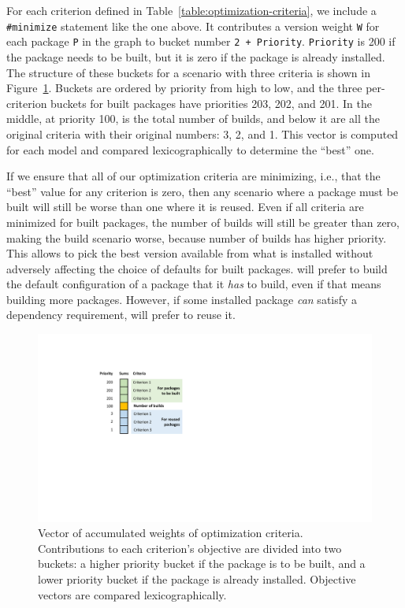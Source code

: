 For each criterion defined in Table~\ref{table:optimization-criteria}, we include a {\tt
  \#minimize} statement like the one above. It contributes a version weight {\tt W} for
each package {\tt P} in the graph to bucket number {\tt 2 + Priority}. {\tt Priority} is
200 if the package needs to be built, but it is zero if the package is already
installed. The structure of these buckets for a scenario with three criteria is shown in
Figure~\ref{fig:opt-vector}. Buckets are ordered by priority from high to low, and the
three per-criterion buckets for built packages have priorities 203, 202, and 201. In the
middle, at priority 100, is the total number of builds, and below it are all the
original criteria with their original numbers: 3, 2, and 1. This vector is computed for
each model and compared lexicographically to determine the ``best'' one.

If we ensure that all of our optimization criteria are minimizing, i.e., that the
``best'' value for any criterion is zero, then any scenario where a package must be
built will still be worse than one where it is reused. Even if all criteria are
minimized for built packages, the number of builds will still be greater than zero,
making the build scenario worse, because number of builds has higher priority. This
allows \spack{} to pick the best version available from what is installed without
adversely affecting the choice of defaults for built packages. \spack{} will prefer to
build the default configuration of a package that it {\it has} to build, even if that
means building more packages. However, if some installed package {\it can} satisfy a
dependency requirement, \spack{} will prefer to reuse it.

\begin{figure}
  \centering
  \includegraphics[width=.8\columnwidth]{figures/sums.pdf}
  \caption{
    Vector of accumulated weights of optimization criteria.
    Contributions to each criterion's objective are divided into two buckets:
    a higher priority bucket if the package is to be built, and a lower priority bucket
    if the package is already installed. Objective vectors are compared lexicographically.
    \vspace{-1em}
    \label{fig:opt-vector}
  }
\end{figure}

